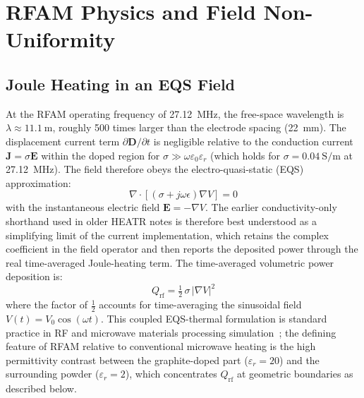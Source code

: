 \documentclass[5p,times]{elsarticle}
\newcommand{\Qrf}{Q_{\mathrm{rf}}}
\newcommand{\vect}[1]{\boldsymbol{#1}}
\newcommand{\half}{\tfrac{1}{2}}
\begin{document}
\FloatBarrier
\section{RFAM Physics and Field Non-Uniformity}
\label{sec:physics}

\subsection{Joule Heating in an EQS Field}

At the RFAM operating frequency of \SI{27.12}{\mega\hertz}, the free-space
wavelength is $\lambda \approx \SI{11.1}{\meter}$, roughly 500 times
larger than the electrode spacing (\SI{22}{\milli\meter}).  The
displacement current term $\partial\vect{D}/\partial t$ is negligible
relative to the conduction current $\vect{J} = \sigma\vect{E}$ within
the doped region for $\sigma \gg \omega\varepsilon_0\varepsilon_r$
(which holds for $\sigma = \SI{0.04}{\siemens\per\meter}$ at
\SI{27.12}{\mega\hertz}).  The field therefore obeys the
electro-quasi-static (EQS) approximation:
\begin{equation}
  \nabla \cdot \left[\left(\sigma + j\omega\epsilon\right)\nabla V\right] = 0
  \label{eq:eqs_pde}
\end{equation}
with the instantaneous electric field $\vect{E} = -\nabla V$.  The
earlier conductivity-only shorthand used in older HEATR notes is
therefore best understood as a simplifying limit of the current
implementation, which retains the complex coefficient in the field
operator and then reports the deposited power through the real
time-averaged Joule-heating term.  The
time-averaged volumetric power deposition is:
\begin{equation}
  \Qrf = \half\,\sigma\,|\nabla V|^{2}
  \label{eq:qrf}
\end{equation}
where the factor of $\half$ accounts for time-averaging the sinusoidal
field $V(t) = V_0\cos(\omega t)$.  This coupled EQS-thermal formulation
is standard practice in RF and microwave materials processing
simulation~\cite{DielectricCeramicsPolymers,ferdous2017rfheating}; the
defining feature of RFAM relative to conventional microwave heating is
the high permittivity contrast between the graphite-doped part
($\varepsilon_r = 20$) and the surrounding powder ($\varepsilon_r = 2$),
which concentrates $\Qrf$ at geometric boundaries as described below.
\end{document}
